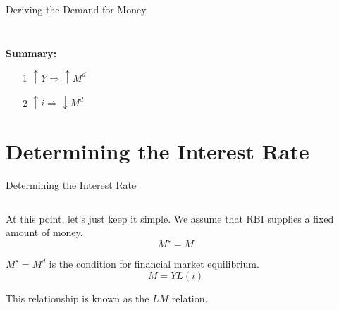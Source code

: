 \documentclass[shownotes,11pt, aspectratio=169]{beamer}
\newenvironment{wideitemize}{\itemize\addtolength{\itemsep}{10pt}}{\enditemize}
\begin{document}
\begin{frame}{Deriving the Demand for Money}
\begin{columns}[T]
\begin{column}{.44\textwidth}
{{    }
  }
\end{column}%
\end{columns}
\pause
\textbf{Summary:}
\begin{itemize}
\item[1] $\uparrow Y \Rightarrow \uparrow M^d $
\item[2] $\uparrow i \Rightarrow \downarrow M^d$
\end{itemize}
\end{frame}

\section{Determining the Interest Rate}
\begin{frame}{Determining the Interest Rate}
\begin{columns}[T] %
\begin{column}{.52\textwidth}
  \begin{wideitemize}
    \item At this point, let's just keep it simple. We assume that RBI supplies a fixed amount of money.
           \[ M^s = M \]
    \item $M^s = M^d$ is the condition for financial market equilibrium.
          \[ M = YL(i) \]
    \item This relationship is known as the $LM$ relation.
  \end{wideitemize}
\end{column}%
\pause
\hfill%
\begin{column}{.44\textwidth}
\end{column}%
\end{columns}
\end{frame}
\end{document}
